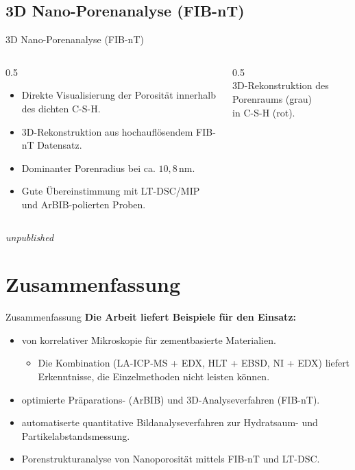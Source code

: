\documentclass[10pt,aspectratio=169]{beamer}
\begin{document}
\subsection{3D Nano-Porenanalyse (FIB-nT)}
\begin{frame}{3D Nano-Porenanalyse (FIB-nT)}
  \begin{columns}
    \begin{column}{0.5\textwidth}
      \begin{itemize}
        \item Direkte Visualisierung der Porosität innerhalb des dichten C-S-H.
        \item 3D-Rekonstruktion aus hochauflösendem FIB-nT Datensatz.
        \item Dominanter Porenradius bei ca. $10,8$\,nm.
        \item Gute Übereinstimmung mit LT-DSC/MIP und ArBIB-polierten Proben.
      \end{itemize}
    \end{column}
    \begin{column}{0.5\textwidth}
      \centering
      \\
      \footnotesize 3D-Rekonstruktion des Porenraums (grau)\\in C-S-H (rot).
    \end{column}
  \end{columns}
  \vfill\raggedleft\tiny\itshape unpublished
\end{frame}

\section{Zusammenfassung}
\begin{frame}{Zusammenfassung}
  \textbf{Die Arbeit liefert Beispiele für den Einsatz:}
  \begin{itemize}
    \item  von korrelativer Mikroskopie für zementbasierte Materialien.
    \begin{itemize}
        \item Die Kombination (LA-ICP-MS + EDX, HLT + EBSD, NI + EDX) liefert Erkenntnisse, die Einzelmethoden nicht leisten können.
    \end{itemize}
    \item optimierte Präparations- (ArBIB) und 3D-Analyseverfahren (FIB-nT).
    \item automatiserte quantitative Bildanalyseverfahren zur Hydratsaum- und Partikelabstandsmessung.
    \item Porenstrukturanalyse von Nanoporosität mittels FIB-nT und LT-DSC.
  \end{itemize}
\end{frame} 
\end{document}
